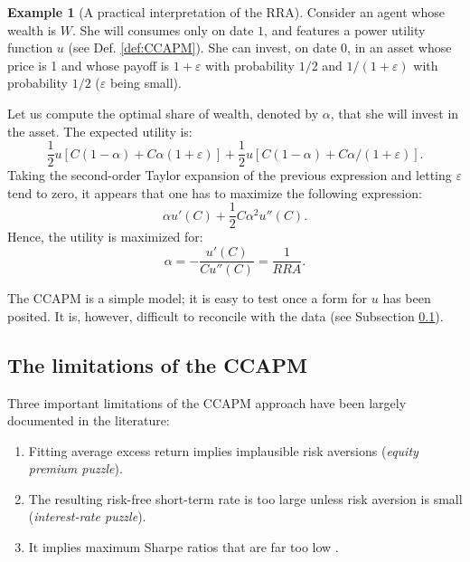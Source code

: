 \documentclass[
  12pt,
]{book}
\providecommand{\tightlist}{%
  \setlength{\itemsep}{0pt}\setlength{\parskip}{0pt}}
\theoremstyle{definition}
\theoremstyle{definition}
\newtheorem{example}{Example}[chapter]
\theoremstyle{definition}
\theoremstyle{definition}
\theoremstyle{remark}
\begin{document}
\begin{example}[A practical interpretation of the RRA]
\protect\hypertarget{exm:CCAPMRRAinvestment}{}\label{exm:CCAPMRRAinvestment}Consider an agent whose wealth is \(W\). She will consumes only on date \(1\), and features a power utility function \(u\) (see Def. \ref{def:CCAPM}). She can invest, on date \(0\), in an asset whose price is 1 and whose payoff is \(1+\varepsilon\) with probability \(1/2\) and \(1/(1+\varepsilon)\) with probability \(1/2\) (\(\varepsilon\) being small).

Let us compute the optimal share of wealth, denoted by \(\alpha\), that she will invest in the asset. The expected utility is:
\[
\frac{1}{2}u\left[C(1-\alpha)+C\alpha(1+\varepsilon)\right] + \frac{1}{2}u\left[C(1-\alpha)+C\alpha/(1+\varepsilon)\right].
\]
Taking the second-order Taylor expansion of the previous expression and letting \(\varepsilon\) tend to zero, it appears that one has to maximize the following expression:
\[
\alpha u'(C) + \frac{1}{2}C \alpha^2 u''(C).
\]
Hence, the utility is maximized for:
\[
\alpha = - \frac{u'(C)}{C u''(C)} = \frac{1}{RRA}.
\]
\end{example}

The CCAPM is a simple model; it is easy to test once a form for \(u\) has been posited. It is, however, difficult to reconcile with the data (see Subsection \ref{limitationsCCAPM}).

\hypertarget{limitationsCCAPM}{%
\subsection{The limitations of the CCAPM}\label{limitationsCCAPM}}

Three important limitations of the CCAPM approach have been largely documented in the literature:

\begin{enumerate}
\def\labelenumi{\alph{enumi}.}
\tightlist
\item
  Fitting average excess return implies implausible risk aversions (\emph{equity premium puzzle}).
\item
  The resulting risk-free short-term rate is too large unless risk aversion is small (\emph{interest-rate puzzle}).
\item
  It implies maximum Sharpe ratios that are far too low \citep{Hansen_Jagannathan_1991}.
\end{enumerate}
\end{document}
